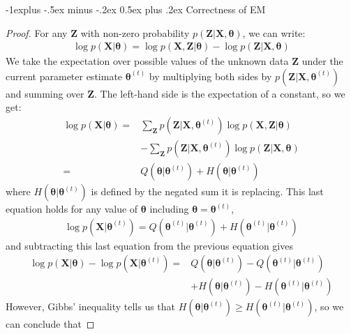 \documentclass[8pt,landscape]{article}
\makeatletter
\renewcommand{\subsection}{\@startsection{subsection}{2}{0mm}%
                                {-1explus -.5ex minus -.2ex}%
                                {0.5ex plus .2ex}%
                                {\normalfont\small\bfseries}}
\makeatother
\begin{document}
\begin{multicols}{3}
\subsection{Correctness of EM}
\begin{proof}
	For any $\mathbf{Z}$ with non-zero probability $p(\mathbf{Z}|\mathbf{X}, \boldsymbol\theta)$, we can write:
	\begin{align*}
		\log p(\mathbf{X}|\boldsymbol\theta) = \log p(\mathbf{X}, \mathbf{Z}|\boldsymbol\theta) - \log p(\mathbf{Z}|\mathbf{X}, \boldsymbol\theta)
	\end{align*}
	We take the expectation over possible values of the unknown data $\mathbf{Z}$ under the current parameter estimate $\boldsymbol\theta^{(t)}$ by multiplying both sides by $p(\mathbf{Z}|\mathbf{X},\boldsymbol\theta^{(t)})$ and summing over $\mathbf{Z}$. The left-hand side is the expectation of a constant, so we get:
	\begin{align*}
		 \log p(\mathbf{X}|\boldsymbol\theta) = &\sum_{\mathbf{Z}} p(\mathbf{Z}|\mathbf{X}, \boldsymbol\theta^{(t)}) \log p(\mathbf{X}, \mathbf{Z}|\boldsymbol\theta)\\
		 &- \sum_{\mathbf{Z}} p(\mathbf{Z}|\mathbf{X}, \boldsymbol\theta^{(t)}) \log p(\mathbf{Z}|\mathbf{X}, \boldsymbol\theta)\\
		 = &Q(\boldsymbol\theta | \boldsymbol\theta^{(t)}) + H(\boldsymbol\theta | \boldsymbol\theta^{(t)})
	\end{align*}
	where $H(\boldsymbol\theta|\boldsymbol\theta^{(t)})$ is defined by the negated sum it is replacing. This last equation holds for any value of $\boldsymbol\theta$ including $\boldsymbol\theta = \boldsymbol\theta^{(t)}$,
	\begin{align*}
		\log p(\mathbf{X}|\boldsymbol\theta^{(t)})
		= Q(\boldsymbol\theta^{(t)}|\boldsymbol\theta^{(t)}) + H(\boldsymbol\theta^{(t)}|\boldsymbol\theta^{(t)})
	\end{align*}
	and subtracting this last equation from the previous equation gives
	\begin{align*}
		\log p(\mathbf{X}|\boldsymbol\theta) - \log p(\mathbf{X}|\boldsymbol\theta^{(t)})
		= &Q(\boldsymbol\theta|\boldsymbol\theta^{(t)}) - Q(\boldsymbol\theta^{(t)}|\boldsymbol\theta^{(t)})\\
		&+ H(\boldsymbol\theta|\boldsymbol\theta^{(t)}) - H(\boldsymbol\theta^{(t)}|\boldsymbol\theta^{(t)})
	\end{align*}
	However, Gibbs' inequality tells us that $H(\boldsymbol\theta|\boldsymbol\theta^{(t)}) \ge H(\boldsymbol\theta^{(t)}|\boldsymbol\theta^{(t)})$, so we can conclude that

\end{proof}
\end{multicols}
\end{document}
